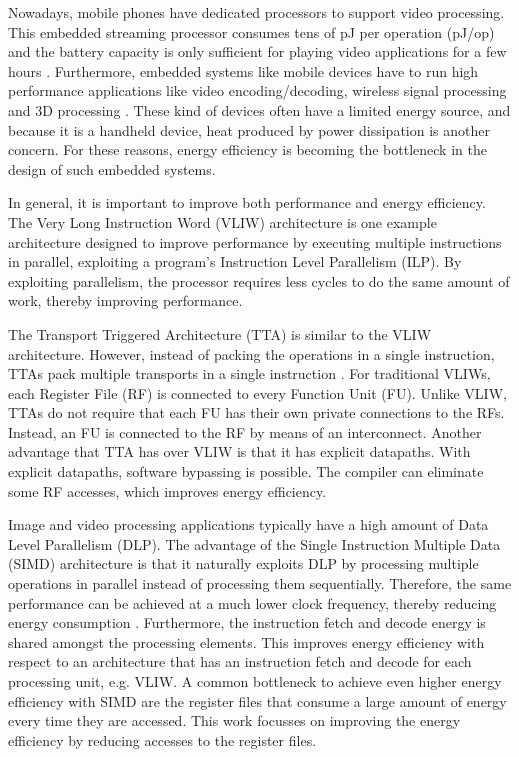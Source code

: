 Nowadays, mobile phones have dedicated processors to support video processing. This embedded streaming processor consumes tens of pJ per operation (pJ/op) and the battery capacity is only sufficient for playing video applications for a few hours \cite{simd}.
Furthermore, embedded systems like mobile devices have to run high performance applications like video encoding/decoding, wireless signal processing and 3D processing \cite{dongrio1}. These kind of devices often have a limited energy source, and because it is a handheld device, heat produced by power dissipation is another concern. For these reasons, energy efficiency is becoming the bottleneck in the design of such embedded systems.

In general, it is important to improve both performance and energy efficiency. The Very Long Instruction Word (VLIW) architecture is one example architecture designed to improve performance by executing multiple instructions in parallel, exploiting a program's Instruction Level Parallelism (ILP). By exploiting parallelism, the processor requires less cycles to do the same amount of work, thereby improving performance. 

The Transport Triggered Architecture (TTA) is similar to the VLIW architecture. However, instead of packing the operations in a single instruction, TTAs pack multiple transports in a single instruction \cite{tta}. For traditional VLIWs, each Register File (RF) is connected to every Function Unit (FU). Unlike VLIW, TTAs do not require that each FU has their own private connections to the RFs. Instead, an FU is connected to the RF by means of an interconnect. Another advantage that TTA has over VLIW is that it has explicit datapaths. With explicit datapaths, software bypassing is possible. The compiler can eliminate some RF accesses, which improves energy efficiency.


Image and video processing applications typically have a high amount of Data Level Parallelism (DLP). The advantage of the Single Instruction Multiple Data (SIMD) architecture is that it naturally exploits DLP by processing multiple operations in parallel instead of processing them sequentially. Therefore, the same performance can be achieved at a much lower clock frequency, thereby reducing energy consumption \cite{dongrio1}. Furthermore, the instruction fetch and decode energy is shared amongst the processing elements. This improves energy efficiency with respect to an architecture that has an instruction fetch and decode for each processing unit, e.g. VLIW. A common bottleneck to achieve even higher energy efficiency with SIMD are the register files that consume a large amount of energy every time they are accessed. This work focusses on improving the energy efficiency by reducing accesses to the register files.

